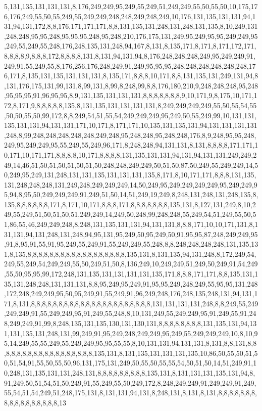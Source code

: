 5,131,135,131,131,131,8,176,249,249,95,249,55,249,51,249,249,55,50,55,50,10,175,176,176,249,55,50,55,249,55,249,249,248,248,249,248,249,10,176,131,135,131,131,94,131,94,131,172,8,8,176,171,171,171,8,8,131,135,131,248,131,248,131,135,8,10,249,131,248,248,95,95,248,95,95,95,248,95,248,210,176,175,131,249,95,249,95,95,249,249,95,249,55,249,55,248,176,248,135,131,248,94,167,8,131,8,135,171,8,171,8,171,172,171,8,8,8,8,9,8,8,8,172,8,8,8,8,131,8,131,94,131,94,8,176,248,248,248,249,95,249,249,91,249,91,55,249,55,8,176,256,176,248,249,91,249,95,95,95,248,248,248,248,248,248,176,171,8,135,131,135,131,131,131,8,135,171,8,8,8,10,171,8,8,131,135,131,249,131,94,8,131,176,175,131,99,131,8,99,131,8,99,8,248,99,8,8,176,180,210,9,248,248,248,95,248,95,95,95,91,96,95,95,8,9,131,135,131,131,131,8,8,8,8,8,8,8,9,10,171,9,8,175,10,171,172,8,171,9,8,8,8,8,8,135,8,131,135,131,131,131,131,8,249,249,249,249,55,50,55,54,55,50,50,55,50,99,172,8,8,249,54,51,55,54,249,249,249,95,249,50,55,249,99,10,131,131,135,131,131,94,131,131,171,10,171,8,171,171,10,135,131,135,131,94,131,131,131,131,248,8,99,248,248,248,248,248,249,248,95,248,248,95,248,248,176,8,9,248,95,95,248,249,95,249,249,95,55,249,55,249,96,171,8,248,248,94,131,131,8,131,8,8,8,8,171,171,10,171,10,171,171,8,8,8,8,10,171,8,8,8,8,131,135,131,131,94,131,94,131,131,249,249,249,14,46,51,50,51,50,51,50,51,50,248,248,249,249,50,51,50,87,50,249,55,249,249,14,50,249,95,249,131,248,131,131,135,131,131,131,135,8,171,8,10,171,171,8,8,8,131,135,131,248,248,248,131,249,248,249,249,249,14,50,249,95,249,249,249,249,95,249,249,95,94,8,95,50,249,249,249,91,249,51,50,14,51,249,19,249,8,248,131,248,131,248,135,8,135,8,8,8,8,8,8,171,8,171,10,171,8,8,8,171,8,8,8,8,8,8,8,135,131,8,127,131,249,8,10,249,55,249,51,50,51,50,51,249,249,14,249,50,248,99,248,248,55,249,54,51,249,55,50,51,86,55,46,249,249,248,8,248,131,135,131,131,94,131,131,8,8,8,171,10,10,171,131,8,131,131,94,131,248,131,248,94,95,131,95,249,50,95,249,50,91,95,95,87,248,249,249,95,91,8,95,91,55,91,95,249,55,249,91,55,249,249,55,248,8,8,248,248,248,248,131,135,131,8,135,8,8,8,8,8,8,8,8,8,8,8,8,8,8,8,8,8,8,135,131,8,131,135,94,131,248,8,172,249,54,249,55,249,54,249,249,55,50,249,51,50,8,136,249,10,249,249,51,249,50,249,91,54,249,55,50,95,95,99,172,248,131,135,131,131,131,131,135,171,8,8,8,171,171,8,8,135,131,135,131,248,248,131,131,131,8,8,95,249,95,249,91,95,95,249,248,249,55,95,95,131,248,172,248,249,249,95,50,95,249,91,55,249,91,96,249,248,176,248,135,248,131,94,131,171,8,131,8,8,8,8,8,8,8,8,8,8,8,8,8,8,8,8,8,8,8,8,8,8,131,131,131,131,248,8,8,249,55,249,249,249,91,55,249,249,95,91,249,55,248,8,10,131,249,55,249,249,95,91,249,55,91,248,249,249,91,99,8,248,135,131,135,130,131,130,131,8,8,8,8,8,8,8,8,131,135,131,94,131,131,135,131,248,131,99,249,91,95,249,248,249,249,95,249,55,249,249,249,10,8,10,95,14,249,55,55,249,55,249,249,95,95,55,55,8,10,131,131,94,131,131,8,131,8,8,131,8,8,8,8,8,8,8,8,8,8,8,8,8,8,8,8,8,8,135,131,8,131,135,131,131,131,135,10,86,50,55,50,51,50,51,54,91,55,50,55,50,96,131,175,131,249,50,55,50,55,55,54,50,51,50,14,51,249,91,10,248,131,135,131,131,248,131,8,8,8,8,8,8,8,8,8,135,131,8,131,131,131,135,131,94,8,91,249,50,51,54,51,50,249,91,55,249,55,50,249,172,8,248,249,249,91,249,249,91,249,55,54,51,54,249,51,248,175,131,8,131,131,94,131,8,248,131,8,131,8,131,8,8,8,8,8,8,8,8,8,8,8,8,8,8,8,8,8,13